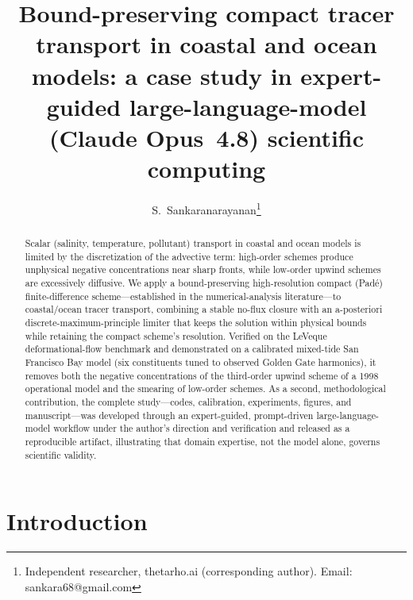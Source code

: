 \documentclass[Journal]{ascelike}   %
\begin{document}
\title{Bound-preserving compact tracer transport in coastal and ocean models:
a case study in expert-guided large-language-model (Claude Opus~4.8)
scientific computing}

\author{S.~Sankaranarayanan\thanks{Independent researcher, thetarho.ai
(corresponding author). Email: sankara68@gmail.com}}
\maketitle

\begin{abstract}
Scalar (salinity, temperature, pollutant) transport in coastal and ocean models is
limited by the discretization of the advective term: high-order schemes produce
unphysical negative concentrations near sharp fronts, while low-order upwind schemes
are excessively diffusive. We apply a bound-preserving high-resolution compact
(Pad\'e) finite-difference scheme---established in the numerical-analysis
literature---to coastal/ocean tracer transport, combining a stable no-flux closure
with an a-posteriori discrete-maximum-principle limiter that keeps the solution within
physical bounds while retaining the compact scheme's resolution. Verified on the
LeVeque deformational-flow benchmark and demonstrated on a calibrated mixed-tide San
Francisco Bay model (six constituents tuned to observed Golden Gate harmonics), it
removes both the negative concentrations of the third-order upwind scheme of a 1998
operational model and the smearing of low-order schemes. As a second, methodological
contribution, the complete study---codes, calibration, experiments, figures, and
manuscript---was developed through an expert-guided, prompt-driven large-language-model
workflow under the author's direction and verification and released as a reproducible
artifact, illustrating that domain expertise, not the model alone, governs scientific
validity.
\end{abstract}


\section{Introduction}
\label{sec:intro}
\end{document}

